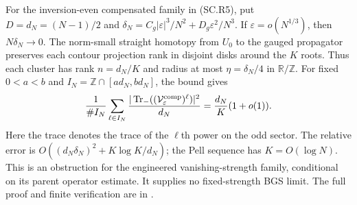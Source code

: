 For the inversion-even compensated family in (SC.R5), put
$D=d_N=(N-1)/2$ and
$\delta_N=C_g|\varepsilon|^3/N^2+D_g\varepsilon^2/N^3$.
If $\varepsilon=o(N^{1/3})$, then $N\delta_N\to0$.
The norm-small straight homotopy from $U_0$ to the gauged propagator
preserves each contour projection rank in disjoint disks around the
$K$ roots. Thus each cluster has rank $n=d_N/K$ and radius at most
$\eta=\delta_N/4$ in $\mathbb R/\mathbb Z$.
For fixed $0<a<b$ and $I_N=\mathbb Z\cap[a d_N,b d_N]$, the bound gives
\[
 \frac1{\# I_N}\sum_{\ell\in I_N}
       \frac{|\operatorname{Tr}_{-}((\mathcal V^{\rm comp}_\varepsilon)^\ell)|^2}{d_N}
   =\frac{d_N}{K}(1+o(1)).
\]
Here the trace denotes the trace of the $\ell$th power on the odd sector.
The relative error is $O((d_N\delta_N)^2+K\log K/d_N)$; the Pell
sequence has $K=O(\log N)$. This is an obstruction for the engineered
vanishing-strength family, conditional on its parent operator estimate.
It supplies no fixed-strength BGS limit. The full proof and finite
verification are in .
